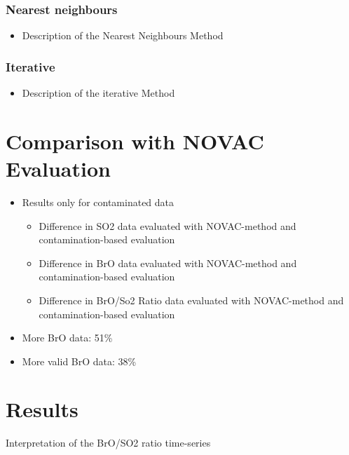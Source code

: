 \documentclass  [
  paper    = a4,
  BCOR     = 10mm,
  twoside,
  fontsize = 12pt,
  fleqn,
  toc      = bibnumbered,
  toc      = listofnumbered,
  numbers  = noendperiod,
  headings = normal,
  listof   = leveldown,
  version  = 3.03
]                                       {scrreprt}
\begin{document}
	\subsection{Nearest neighbours}
	\begin{itemize}
		\item Description of the Nearest Neighbours Method
	\end{itemize}
	\subsection{Iterative}
	\begin{itemize}
		\item Description of the iterative Method
	\end{itemize}
	\chapter{Comparison with NOVAC Evaluation}
	\begin{itemize}
		\item Results only for contaminated data
		\begin{itemize}
			\item Difference in SO2 data evaluated with NOVAC-method and contamination-based evaluation
			\item Difference in BrO data evaluated with NOVAC-method and contamination-based evaluation
			\item Difference in BrO/So2 Ratio data evaluated with NOVAC-method and contamination-based evaluation
		\end{itemize}
		\item More BrO data: 51\%
		\item  More valid BrO data: 38\%
	\end{itemize}
	\chapter{Results}
	Interpretation of the BrO/SO2 ratio time-series
\end{document}
